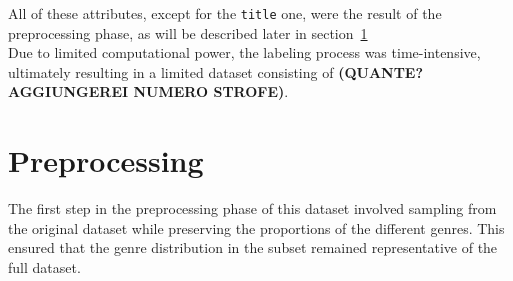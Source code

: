 All of these attributes, except for the \texttt{title} one, were the result
of the preprocessing phase, as will be described later in section~\ref{preprocessing}\\
Due to limited computational power, the labeling process was time-intensive,
ultimately resulting in a limited dataset consisting of
\textbf{(QUANTE? AGGIUNGEREI NUMERO STROFE)}.


\section{Preprocessing}
\label{preprocessing}
The first step in the preprocessing phase of this dataset involved sampling
from the original dataset while preserving the proportions of the different genres. 
This ensured that the genre distribution in the subset remained representative
of the full dataset.\\



